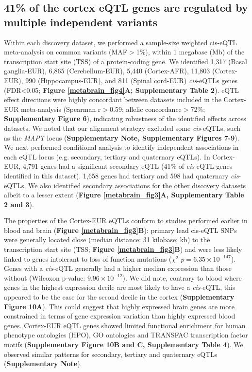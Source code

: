 \subsection{41\% of the cortex eQTL genes are regulated by multiple independent variants}
Within each discovery dataset, we performed a sample-size weighted cis-eQTL meta-analysis on common variants (MAF$>$1\%), within 1 megabase (Mb) of the transcription start site (TSS) of a protein-coding gene. We identified 1,317 (Basal ganglia-EUR), 6,865 (Cerebellum-EUR), 5,440 (Cortex-AFR), 11,803 (Cortex-EUR), 990 (Hippocampus-EUR), and 811 (Spinal cord-EUR) \emph{cis}-eQTLs genes (FDR<0.05; \textbf{Figure \ref{metabrain_fig4}A; Supplementary Table 2}). eQTL effect directions were highly concordant between datasets included in the Cortex-EUR meta-analysis (Spearman r$>$0.59; allelic concordance$>$72\%; \textbf{Supplementary Figure 6}), indicating robustness of the identified effects across datasets. We noted that our alignment strategy excluded some \emph{cis}-eQTLs, such as the \emph{MAPT} locus (\textbf{Supplementary Note, Supplementary Figures 7-9}). We next performed conditional analysis to identify independent associations in each eQTL locus (e.g. secondary, tertiary and quaternary eQTLs). In Cortex-EUR, 4,791 genes had a significant secondary eQTL (41\% of \emph{cis}-eQTL genes identified in this dataset). 1,658 genes had tertiary and 598 had quaternary \emph{cis}-eQTLs. We also identified secondary associations for the other discovery datasets albeit to a lesser extent (\textbf{Figure \ref{metabrain_fig3}A, Supplementary Table 2 and 3}).  

The properties of the Cortex-EUR eQTLs conform to studies performed earlier in blood\cite{vosaUnravelingPolygenicArchitecture2018} and brain\cite{dobbynLandscapeConditionalEQTL2018} (\textbf{Figure \ref{metabrain_fig3}B}): primary lead cis-eQTL SNPs were generally located close (median distance: 31 kilobase; kb) to the transcription start site (TSS; \textbf{Figure \ref{metabrain_fig3}B}) and were less likely linked to genes intolerant to loss of function mutations ($\chi^2$ $p = 6.35 \times 10^{-147}$). Genes with a \emph{cis}-eQTL generally had a higher median expression than those without (Wilcoxon p-value: $9.96 \times 10^{-12}$). We did note, contrary to blood where genes in the highest expression decile are most likely to have a \emph{cis}-eQTL, this appeared to be the case for the second decile in the cortex (\textbf{Supplementary Figure 10A}). This could suggest that highly expressed brain genes are more constrained in terms of gene expression variation than highly expressed blood genes. Cortex-EUR eQTL genes showed limited functional enrichment for human phenotype ontologies (HPO), GO ontologies and TRANSFAC\cite{wingenderTRANSFACDatabaseTranscription1996} transcription factor motifs (\textbf{Supplementary Figure 10B and C, Supplementary Table 4}). We observed similar patterns for secondary, tertiary and quaternary eQTLs (\textbf{Supplementary Note}). 

